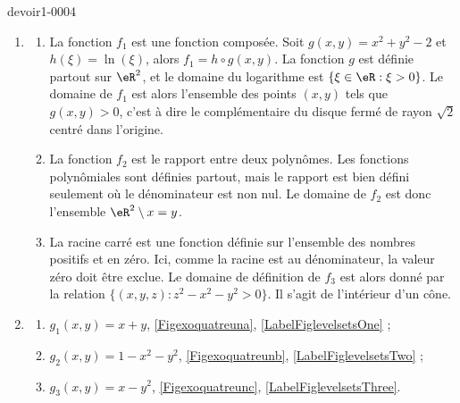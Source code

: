\begin{corrige}{devoir1-0004}
  \begin{enumerate}
  \item 
    \begin{enumerate}
    \item  La fonction $f_1$ est une fonction composée. Soit $g(x,y)=x^2+y^2-2$ et $h(\xi)=\ln(\xi)$, alors $f_1=h\circ g (x,y)$. La fonction $g$ est définie partout sur $\eR^2$, et le domaine du logarithme est $\{\xi\in\eR : \xi>0\}$. Le domaine de $f_1$ est alors l'ensemble des points $(x,y)$ tels que $g(x,y)>0$, c'est à dire le complémentaire du disque fermé de rayon $\sqrt{2}$ centré dans l'origine. 
 
    \item  La fonction $f_2$ est le rapport entre deux polynômes. Les fonctions polynômiales sont définies partout, mais le rapport est bien défini seulement où le dénominateur est non nul. Le domaine de $f_2$ est donc l'ensemble $\eR^2\setminus {x=y}$. 

    \item  La racine carré est une fonction définie sur l'ensemble des nombres positifs et en zéro. Ici, comme la racine est au dénominateur, la valeur zéro doit être exclue. Le domaine de définition de $f_3$ est alors donné par la relation $\{(x,y,z) : z^2-x^2-y^2 >0\}$. Il s'agit de l'intérieur d'un cône.   

    \end{enumerate}
  
  \item 

    \begin{enumerate}
    \item   $\displaystyle g_1(x,y)= x+y$, \ref{Figexoquatreuna}, \ref{LabelFiglevelsetsOne} ;
    \item   $\displaystyle g_2(x,y)= 1-x^2-y^2$, \ref{Figexoquatreunb}, \ref{LabelFiglevelsetsTwo} ;
    \item   $\displaystyle g_3(x,y)= x-y^2$, \ref{Figexoquatreunc}, \ref{LabelFiglevelsetsThree}.
    \end{enumerate}
  \end{enumerate}


\newcommand{\CaptionFiglevelsetsOne}{}


\newcommand{\CaptionFiglevelsetsTwo}{}

 
\newcommand{\CaptionFiglevelsetsThree}{}



\end{corrige}

